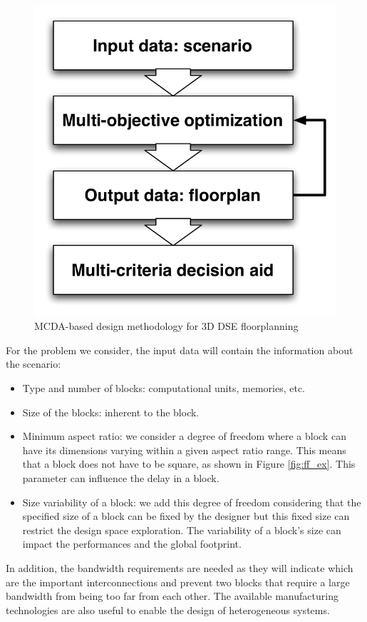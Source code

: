 \begin{figure}[h!]
\begin{center}
\includegraphics[width=0.5\linewidth]{MCDA_Method.pdf}
\end{center}
\vspace{-0.5cm}
\caption{MCDA-based design methodology for 3D DSE floorplanning}
\label{fig:mcdaflow}
\end{figure}

For the problem we consider, the input data will contain the information about the scenario:
\begin{itemize}
\item Type and number of blocks: computational units, memories, etc.
\item Size of the blocks: inherent to the block.
\item Minimum aspect ratio: we consider a degree of freedom where a block can have its dimensions varying within a given aspect ratio range. This means that a block does not have to be square, as shown in Figure \ref{fig:ff_ex}. This parameter can influence the delay in a block.
\item Size variability of a block: we add this degree of freedom considering that the specified size of a block can be fixed by the designer but this fixed size can restrict the design space exploration. The variability of a block's size can impact the performances and the global footprint.
\end{itemize}
In addition, the bandwidth requirements are needed as they will indicate which are the important interconnections and prevent two blocks that require a large bandwidth from being too far from each other. The available manufacturing technologies are also useful to enable the design of heterogeneous systems.

